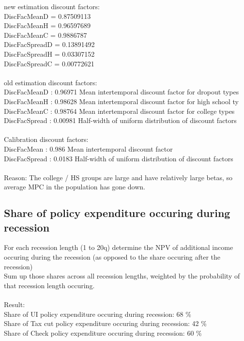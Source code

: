 \documentclass[]{article}
\begin{document}
new estimation discount factors: \\
DiscFacMeanD = 0.87509113  \\
DiscFacMeanH = 0.96597689 \\
DiscFacMeanC = 0.9886787 \\
DiscFacSpreadD = 0.13891492 \\
DiscFacSpreadH = 0.03307152 \\
DiscFacSpreadC = 0.00772621 \\
\\
old estimation discount factors: \\
DiscFacMeanD : 0.96971    Mean intertemporal discount factor for dropout types \\
DiscFacMeanH : 0.98628   Mean intertemporal discount factor for high school ty \\
DiscFacMeanC : 0.98764   Mean intertemporal discount factor for college types \\
DiscFacSpread : 0.00981   Half-width of uniform distribution of discount factors \\
\\
Calibration discount factors: \\
DiscFacMean     : 0.986      Mean intertemporal discount factor  \\
DiscFacSpread   : 0.0183     Half-width of uniform distribution of discount factors\\
\\
Reason: The college / HS groups are large and have relatively large betas, so average MPC in the population has gone down.

\FloatBarrier
\subsection{Share of policy expenditure occuring during recession}

For each recession length (1 to 20q) determine the NPV of additional income occuring during the recession (as opposed to the share occuring after the recession) \\
Sum up those shares across all recession lengths, weighted by the probability of that recession length occuring.\\
\\
Result:\\
Share of UI policy expenditure occuring during recession:  68 \% \\
Share of Tax cut policy expenditure occuring during recession:  42 \%  \\
Share of Check policy expenditure occuring during recession:  60 \%  \\
\end{document}
